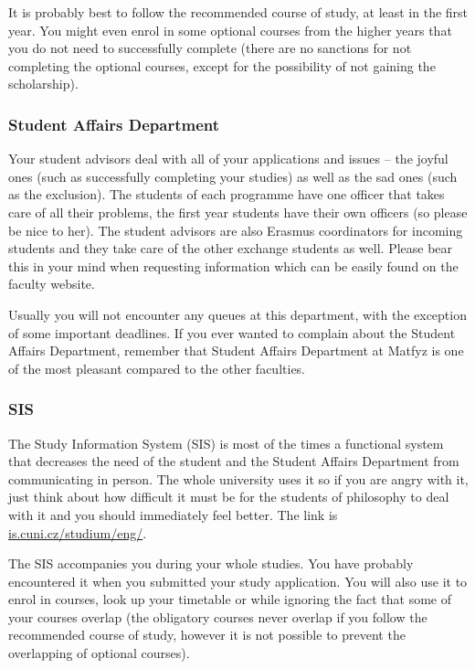 It is probably best to follow the recommended course of study, at least in the
first year. You might even enrol in some optional courses from the higher years
that you do not need to successfully complete (there are no sanctions for not
completing the optional courses, except for the possibility of not gaining the
scholarship).


\subsubsection{Student Affairs Department}
Your student advisors deal with all of your applications and issues -- the
joyful ones (such as successfully completing your studies) as well as the sad
ones (such as the exclusion).
The students of each programme have one officer that takes care of all their
problems, the first year students have their own officers (so please be nice to
her).
The student advisors are also Erasmus coordinators for incoming students and
they take care of the other exchange students as well. Please bear this in your
mind when requesting information which can be easily found on the faculty
website.

Usually you will not encounter any queues at this department, with the exception
of some important deadlines. If you ever wanted to complain about the Student
Affairs Department, remember that Student Affairs Department at Matfyz is one of
the most pleasant compared to the other faculties.


\subsubsection{SIS}
The Study Information System (SIS) is most of the times a functional system that
decreases the need of the student and the Student Affairs Department from
communicating in person.
The whole university uses it so if you are angry with it, just think about how
difficult it must be for the students of philosophy to deal with it and you
should immediately feel better. The link is \url{is.cuni.cz/studium/eng/}.

The SIS accompanies you during your whole studies. You have probably encountered
it when you submitted your study application.
You will also use it to enrol in courses, look up your timetable or while
ignoring the fact that some of your courses overlap (the obligatory courses
never overlap if you follow the recommended course of study, however it is not
possible to prevent the overlapping of optional courses).

